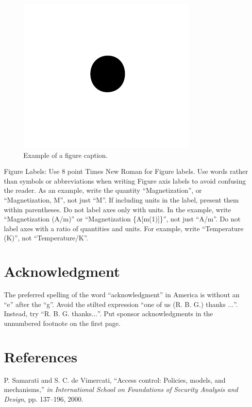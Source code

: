 \documentclass[conference]{IEEEtran}
\begin{document}
\begin{sloppypar}
\begin{figure}[htbp]
\centerline{\includegraphics{fig1.png}}
\caption{Example of a figure caption.}
\label{fig}
\end{figure}

Figure Labels: Use 8 point Times New Roman for Figure labels. Use words 
rather than symbols or abbreviations when writing Figure axis labels to 
avoid confusing the reader. As an example, write the quantity 
``Magnetization'', or ``Magnetization, M'', not just ``M''. If including 
units in the label, present them within parentheses. Do not label axes only 
with units. In the example, write ``Magnetization (A/m)'' or ``Magnetization 
\{A[m(1)]\}'', not just ``A/m''. Do not label axes with a ratio of 
quantities and units. For example, write ``Temperature (K)'', not 
``Temperature/K''.

\section*{Acknowledgment}

The preferred spelling of the word ``acknowledgment'' in America is without 
an ``e'' after the ``g''. Avoid the stilted expression ``one of us (R. B. 
G.) thanks $\ldots$''. Instead, try ``R. B. G. thanks$\ldots$''. Put sponsor 
acknowledgments in the unnumbered footnote on the first page.

\section*{References}


\begin{thebibliography}{00}
    P. Samarati and S. C. de Vimercati, ``Access control: Policies, models, and mechanisms,'' {\em in International School on Foundations of Security Analysis and Design}, pp. 137–196, 2000.
  

\end{thebibliography}
\end{sloppypar}
\end{document}

